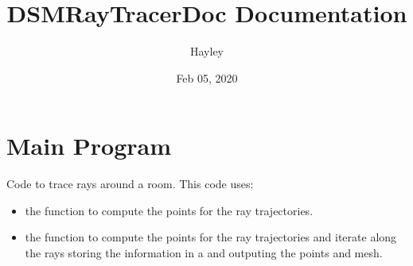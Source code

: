 \documentclass[letterpaper,10pt,english]{sphinxmanual}
\title{DSMRayTracerDoc Documentation}
\date{Feb 05, 2020}
\author{Hayley}
\begin{document}
\maketitle
\tableofcontents
{}\label{index::doc}



\chapter{Main Program}
\label{index:module-RayTracerMainProgram}\label{index:welcome-to-dsmraytracerdoc-s-documentation}\label{index:main-program}
Code to trace rays around a room. This code uses:
\begin{itemize}
\item {} 
the function {\hyperref[index:RayTracerMainProgram.RayTracer]{}} to compute the points for   the ray trajectories.

\item {} 
the function {\hyperref[index:RayTracerMainProgram.MeshProgram]{}} to compute the points for   the ray trajectories and iterate along the rays storing the   information in a {\hyperref[index:DictionarySparseMatrix.DS]{}} and outputing   the points and mesh.

\end{itemize}
\end{document}
